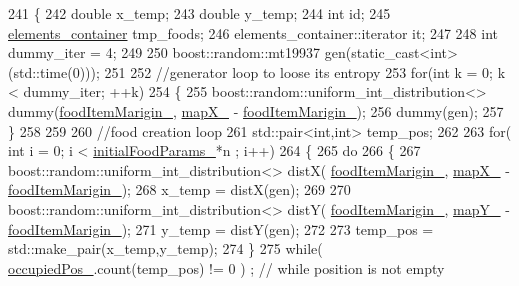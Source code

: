 \begin{DoxyCode}
241     \{
242         \textcolor{keywordtype}{double} x\_temp;
243         \textcolor{keywordtype}{double} y\_temp;
244         \textcolor{keywordtype}{int} id;
245         \hyperlink{classwebsocket_1_1GameBoard_a6340e99ab84e0fc9ee504f5874073c0c}{elements\_container} tmp\_foods;
246         elements\_container::iterator it;
247 
248         \textcolor{keywordtype}{int} dummy\_iter = 4;
249         
250         boost::random::mt19937 gen(static\_cast<int>(std::time(0)));
251 
252         \textcolor{comment}{//generator loop to loose its entropy}
253         \textcolor{keywordflow}{for}(\textcolor{keywordtype}{int} k = 0; k < dummy\_iter; ++k)
254         \{
255             boost::random::uniform\_int\_distribution<> dummy(\hyperlink{classwebsocket_1_1GameBoard_a1bedb4dff215404c5574f064c68789c8}{foodItemMarigin\_}, 
      \hyperlink{classwebsocket_1_1GameBoard_a02d0925d31cf26c6853cbb39de6f051c}{mapX\_} - \hyperlink{classwebsocket_1_1GameBoard_a1bedb4dff215404c5574f064c68789c8}{foodItemMarigin\_});
256             dummy(gen);
257         \}
258 
259 
260         \textcolor{comment}{//food creation loop}
261         std::pair<int,int> temp\_pos;
262 
263         \textcolor{keywordflow}{for}( \textcolor{keywordtype}{int} i = 0; i < \hyperlink{classwebsocket_1_1GameBoard_a80f3a0b794866a7e3c9dac0bf15ba14a}{initialFoodParams\_}*n ; i++)
264         \{
265             \textcolor{keywordflow}{do}
266             \{
267                     boost::random::uniform\_int\_distribution<> distX(
      \hyperlink{classwebsocket_1_1GameBoard_a1bedb4dff215404c5574f064c68789c8}{foodItemMarigin\_}, \hyperlink{classwebsocket_1_1GameBoard_a02d0925d31cf26c6853cbb39de6f051c}{mapX\_} - \hyperlink{classwebsocket_1_1GameBoard_a1bedb4dff215404c5574f064c68789c8}{foodItemMarigin\_});
268                     x\_temp = distX(gen);
269                     
270                     boost::random::uniform\_int\_distribution<> distY(
      \hyperlink{classwebsocket_1_1GameBoard_a1bedb4dff215404c5574f064c68789c8}{foodItemMarigin\_}, \hyperlink{classwebsocket_1_1GameBoard_a60432d0d991c965b75ad2557e9610425}{mapY\_} - \hyperlink{classwebsocket_1_1GameBoard_a1bedb4dff215404c5574f064c68789c8}{foodItemMarigin\_});
271                     y\_temp = distY(gen);
272 
273                     temp\_pos = std::make\_pair(x\_temp,y\_temp);
274             \} 
275             \textcolor{keywordflow}{while}( \hyperlink{classwebsocket_1_1GameBoard_aca1010defacfdd0ea5f032035ce7105e}{occupiedPos\_}.count(temp\_pos) != 0 ) ; \textcolor{comment}{// while position is not empty}

\end{DoxyCode}
